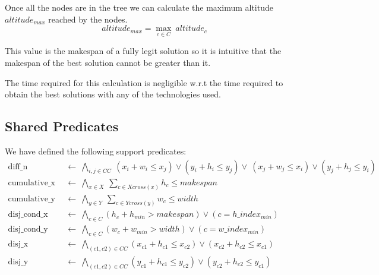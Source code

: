         Once all the nodes are in the tree we can calculate the maximum altitude $altitude_{max}$ reached by the nodes.
        \begin{equation*}
            altitude_{max} = \max_{c \in C}\  altitude_c
        \end{equation*}

        This value is the makespan of a fully legit solution so it is intuitive that the makespan of the best solution cannot
        be greater than it. 
        
        The time required for this calculation is negligible w.r.t the time required to obtain the best solutions with any 
        of the technologies used.



\subsection{Shared Predicates} \label{sec:shared_predicates}
    We have defined the following support predicates:
    \begin{align}
              \text{diff\_n}\ &\ \leftarrow\ \bigwedge_{i,j \in CC}\ (x_i + w_i \leq x_j) \lor (y_i + h_i \leq y_j) \lor\ (x_j + w_j \leq x_i) \lor (y_j + h_j \leq y_i) \label{eq:diffn}        \\
        \text{cumulative\_x}\ &\ \leftarrow\ \bigwedge_{x \in X}\ \sum_{c \in Xcross(x)} h_c \leq makespan                                                               \label{eq:cumulative_x} \\
        \text{cumulative\_y}\ &\ \leftarrow\ \bigwedge_{y \in Y}\ \sum_{c \in Ycross(y)} w_c \leq width                                                                  \label{eq:cumulative_y} \\
        \text{disj\_cond\_x}\ &\ \leftarrow\ \bigwedge_{c \in C} (h_c + h_{min} > makespan) \lor (c = h\_index_{min})                                                    \nonumber \\
        \text{disj\_cond\_y}\ &\ \leftarrow\ \bigwedge_{c \in C} (w_c + w_{min} > width) \lor (c = w\_index_{min})                                                       \nonumber \\
              \text{disj\_x}\ &\ \leftarrow\ \bigwedge_{(c1,c2) \in CC} (x_{c1} + h_{c1} \leq x_{c2}) \lor (x_{c2} + h_{c2} \leq x_{c1})                                 \nonumber \\
              \text{disj\_y}\ &\ \leftarrow\ \bigwedge_{(c1,c2) \in CC} (y_{c1} + h_{c1} \leq y_{c2}) \lor (y_{c2} + h_{c2} \leq y_{c1})                                 \nonumber
    \end{align}


